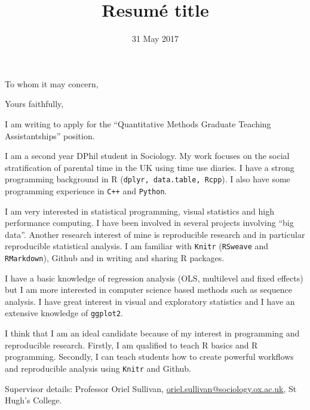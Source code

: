 \documentclass[11pt,a4paper,sans]{moderncv}        %
\title{Resumé title}                               %
\begin{document}
\date{31 May 2017}
\opening{To whom it may concern,}
\closing{Yours faithfully,}
\makelettertitle

I am writing to apply for the “Quantitative Methods Graduate Teaching Assistantships” position. 

I am a second year DPhil student in Sociology. My work focuses on the social stratification of parental time in the UK using time use diaries. I have a strong programming background in R (\texttt{dplyr, data.table, Rcpp}). I also have some programming experience in \texttt{C++} and \texttt{Python}. 

I am very interested in statistical programming, visual statistics and high performance computing. I have been involved in several projects involving ``big data''. 
Another research interest of mine is reproducible research and in particular reproducible statistical analysis. I am familiar with \texttt{Knitr} (\texttt{RSweave} and \texttt{RMarkdown}), Github and in writing and sharing R packages.

 I have a basic knowledge of regression analysis (OLS, multilevel and fixed effects) but I am more interested in computer science based methods such as sequence analysis. I have great interest in visual and exploratory statistics and I have an extensive knowledge of \texttt{ggplot2}. 

I think that I am an ideal candidate because of my interest in programming and reproducible research. Firstly, I am qualified to teach R basics and R programming. Secondly, I can teach students how to create powerful workflows and reproducible analysis using \texttt{Knitr} and Github. 

Supervisor details: Professor Oriel Sullivan, \href{mailto:oriel.sullivan@sociology.ox.ac.uk}{oriel.sullivan@sociology.ox.ac.uk}, St Hugh's College.


\makeletterclosing
\end{document}
